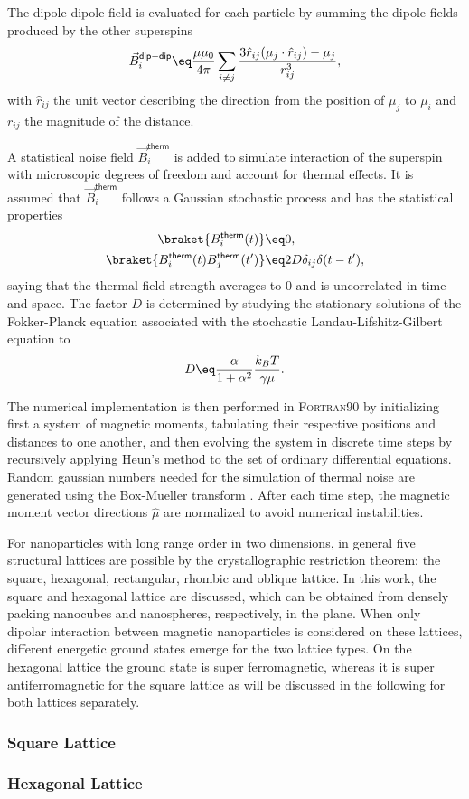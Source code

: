 \documentclass[\main/dresen_thesis.tex]{subfiles}
\begin{document}
  The dipole-dipole field is evaluated for each particle by summing the dipole fields produced by the other superspins
  \begin{align}
    \vec{B}^\mathsf{dip-dip}_i \eq \frac{\mu \mu_0}{4 \pi}  \sum_{i \neq j} \frac{3 \hat{r}_{ij}  (\mu_j \cdot \hat{r}_{ij}) - \mu_j}{r_{ij}^3},
  \end{align}
  with $\hat{r}_{ij}$ the unit vector describing the direction from the position of $\mu_j$ to $\mu_i$ and $r_{ij}$ the magnitude of the distance.

  A statistical noise field $\vec{B}^\mathsf{therm}_i$ is added to simulate interaction of the superspin with microscopic degrees of freedom and account for thermal effects.
  It is assumed that $\vec{B}^\mathsf{therm}_i$ follows a Gaussian stochastic process and has the statistical properties
  \begin{align}
    \braket{B^\mathsf{therm}_i (t)} &\eq 0,\\
    \braket{B^\mathsf{therm}_i (t) B^\mathsf{therm}_j (t^\prime)} &\eq 2 D \delta_{ij} \delta(t - t^\prime),
  \end{align}
  saying that the thermal field strength averages to 0 and is uncorrelated in time and space.
  The factor $D$ is determined by studying the stationary solutions of the Fokker-Planck equation associated with the stochastic Landau-Lifshitz-Gilbert equation to \cite{Garcia_1998_Lange}
  \begin{align}
    D \eq \frac{\alpha}{1 + \alpha^2} \frac{k_B T}{\gamma \mu}.
  \end{align}

  The numerical implementation is then performed in \textsc{Fortran90} by initializing first a system of magnetic moments, tabulating their respective positions and distances to one another, and then evolving the system in discrete time steps by recursively applying Heun's method \cite{Sueli_2003_Anint} to the set of ordinary differential equations.
  Random gaussian numbers needed for the simulation of thermal noise are generated using the Box-Mueller transform \cite{Box_1957_Anoteo}.
  After each time step, the magnetic moment vector directions $\hat{\mu}$ are normalized to avoid numerical instabilities.

  For nanoparticles with long range order in two dimensions, in general five structural lattices are possible by the crystallographic restriction theorem: the square, hexagonal, rectangular, rhombic and oblique lattice.
  In this work, the square and hexagonal lattice are discussed, which can be obtained from densely packing nanocubes and nanospheres, respectively, in the plane.
  When only dipolar interaction between magnetic nanoparticles is considered on these lattices, different energetic ground states emerge for the two lattice types.
  On the hexagonal lattice the ground state is super ferromagnetic, whereas it is super antiferromagnetic for the square lattice as will be discussed in the following for both lattices separately.

  \subsubsection{Square Lattice}
    

  \subsubsection{Hexagonal Lattice}
\end{document}
